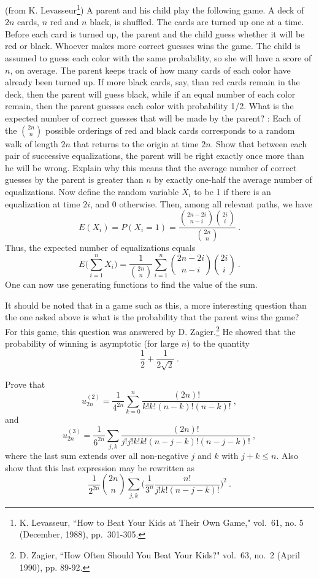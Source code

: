 \begin{LJSItem}
\istar\label{exer 12.1.10}
(from K. Levasseur\footnote{K. Levasseur, ``How to Beat Your Kids at Their
Own Game,"  vol.~61, no. 5 (December, 1988),
pp.~301-305.}) A parent and his child play the following game.  A deck of $2n$
cards, $n$ red and $n$ black, is shuffled.  The cards are turned up one at a time.  Before each card
is turned up, the parent and the child guess whether it will be red or black.  Whoever makes more
correct guesses wins the game.  The child is assumed to guess each color with the same probability,
so she will have a score of
$n$, on average.  The parent keeps track of how many cards of each color have already been
turned up.  If more black cards, say, than red cards remain in the deck, then the parent will
guess black, while if an equal number of each color remain, then the parent guesses each
color with probability 1/2.  What is the expected number of correct guesses that will be made
by the parent?  :  Each of the ${{2n}\choose n}$ possible orderings of red and
black cards corresponds to a random walk of length $2n$ that returns to the origin at time
$2n$.  Show that between each pair of successive equalizations, the parent will be right
exactly once more than he will be wrong.  Explain why this means that the average number of
correct guesses by the parent is greater than $n$ by exactly one-half the average number of
equalizations.  Now define the random variable $X_i$ to be 1 if there is an equalization at
time $2i$, and 0 otherwise.  Then, among all relevant paths, we have
$$E(X_i) = P(X_i = 1) = \frac{{{2n-2i}\choose{n-i}}{{2i}\choose{i}}}{{{2n}\choose{n}}}\ .$$
Thus, the expected number of equalizations equals
$$E\biggl(\sum_{i = 1}^n X_i\biggr) = \frac 1{{{2n}\choose{n}}}\sum_{i = 1}^n 
{{2n-2i}\choose{n-i}}{{2i}\choose{i}}\ .$$
One can now use generating functions to find the value of the sum.
\par
It should be noted that in a game such as this, a more interesting question than the one
asked above is what is the probability that the parent wins the game?  For this game, this
question was answered by D. Zagier.\footnote{D. Zagier, ``How Often Should You Beat
Your Kids?"  vol.~63, no.\ 2 (April 1990), pp. 89-92.} 
He showed that the probability of winning is asymptotic (for large
$n$) to the quantity
$$\frac 12 + \frac 1{2\sqrt 2}\ .$$

\item\label{exer 12.1.11}
Prove that
$$u^{(2)}_{2n} = \frac 1{4^{2n}} \sum_{k = 0}^n \frac {(2n)!}{k!k!(n-k)!(n-k)!}\ ,$$
and
$$u^{(3)}_{2n} = \frac 1{6^{2n}} \sum_{j,k} \frac {(2n)!}{j!j!k!k!(n-j-k)!(n-j-k)!}\ ,$$
where the last sum extends over all non-negative $j$ and $k$ with $j+k \le n$.  Also show
that this last expression may be rewritten as
$$\frac 1{2^{2n}}{{2n}\choose n} \sum_{j,k} 
\biggl(\frac 1{3^n}\frac{n!}{j!k!(n-j-k)!}\biggr)^2\ .$$


\end{LJSItem}
